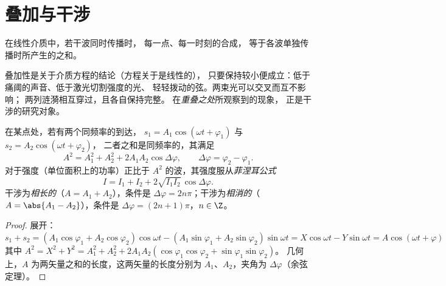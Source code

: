 \section{叠加与干涉}

\begin{theorem}[叠加原理]\label{thm:b1:wave-propagation:superposition}
在线性介质中，若干波同时传播时，
每一点、每一时刻的合成，
等于各波单独传播时所产生的之和。
\end{theorem}
\admitted

\begin{remark}[线性]\label{rem:b1:wave-propagation:linearity}
叠加性是关于介质方程的结论（方程关于是线性的），
只要保持较小便成立：低于痛阈的声音、低于激光切割强度的光、
轻轻拨动的弦。两束光可以交叉而互不影响；
两列涟漪相互穿过，且各自保持完整。
在\emph{重叠之处}所观察到的现象，
正是干涉的研究对象。
\end{remark}

\begin{theorem}[同频率的两个正弦信号]\label{thm:b1:wave-propagation:fresnel}
在某点处，若有两个同频率的到达，
$s_1 = A_1\cos(\omega t + \varphi_1)$ 与 $s_2 = A_2\cos(\omega t + \varphi_2)$，
二者之和是同频率的，其满足
\[
A^2 = A_1^2 + A_2^2 + 2A_1A_2\cos\Delta\varphi,
\qquad \Delta\varphi = \varphi_2 - \varphi_1 .
\]
对于强度（单位面积上的功率）正比于
$A^2$ 的波，其强度服从\emph{菲涅耳公式}
\[
I = I_1 + I_2 + 2\sqrt{I_1 I_2}\,\cos\Delta\varphi .
\]
干涉为\emph{相长的}（$A = A_1 + A_2$），条件是
$\Delta\varphi = 2n\pi$；干涉为\emph{相消的}（$A = \abs{A_1 - A_2}$），条件是
$\Delta\varphi = (2n + 1)\pi$，$n \in \Z$。
\end{theorem}

\begin{proof}
展开：$s_1 + s_2 = (A_1\cos\varphi_1 + A_2\cos\varphi_2)\cos\omega t -
(A_1\sin\varphi_1 + A_2\sin\varphi_2)\sin\omega t = X\cos\omega t -
Y\sin\omega t = A\cos(\omega t + \varphi)$ 其中 $A^2 = X^2 + Y^2 =
A_1^2 + A_2^2 + 2A_1A_2(\cos\varphi_1\cos\varphi_2 + \sin\varphi_1\sin\varphi_2)$。
几何上，$A$ 为两矢量之和的长度，这两矢量的长度分别为
$A_1$、$A_2$，夹角为 $\Delta\varphi$（余弦定理）。
\end{proof}

